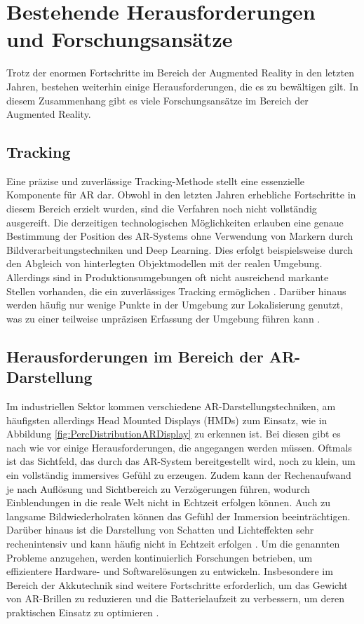 \section{Bestehende Herausforderungen und Forschungsansätze}
Trotz der enormen Fortschritte im Bereich der Augmented Reality in den letzten
Jahren, bestehen weiterhin einige Herausforderungen, die es zu bewältigen gilt.
In diesem Zusammenhang gibt es viele Forschungsansätze im Bereich der Augmented
Reality.
\subsection{Tracking}
Eine präzise und zuverlässige Tracking-Methode stellt eine essenzielle
Komponente für AR dar. Obwohl in den letzten Jahren erhebliche Fortschritte in
diesem Bereich erzielt wurden, sind die Verfahren noch nicht vollständig
ausgereift. Die derzeitigen technologischen Möglichkeiten erlauben eine genaue
Bestimmung der Position des AR-Systems ohne Verwendung von Markern durch
Bildverarbeitungstechniken und Deep Learning. Dies erfolgt beispielsweise durch
den Abgleich von hinterlegten Objektmodellen mit der realen
Umgebung.\cite{7907444} Allerdings sind in Produktionsumgebungen oft nicht
ausreichend markante Stellen vorhanden, die ein zuverlässiges Tracking
ermöglichen \cite{devagiri2022augmented}. Darüber hinaus werden häufig nur
wenige Punkte in der Umgebung zur Lokalisierung genutzt, was zu einer teilweise
unpräzisen Erfassung der Umgebung führen kann \cite{chen2019design}.

\subsection{Herausforderungen im Bereich der AR-Darstellung}

Im industriellen Sektor kommen verschiedene AR-Darstellungstechniken, am
häufigsten allerdings Head Mounted Displays (HMDs) zum Einsatz, wie in Abbildung
\ref{fig:PercDistributionARDisplay} zu erkennen ist. Bei diesen gibt es nach
wie vor einige Herausforderungen, die angegangen werden müssen. Oftmals ist das
Sichtfeld, das durch das AR-System bereitgestellt wird, noch zu klein, um ein
vollständig immersives Gefühl zu erzeugen. Zudem kann der Rechenaufwand je nach
Auflösung und Sichtbereich zu Verzögerungen führen, wodurch Einblendungen in
die reale Welt nicht in Echtzeit erfolgen können. Auch zu langsame
Bildwiederholraten können das Gefühl der Immersion beeinträchtigen. Darüber
hinaus ist die Darstellung von Schatten und Lichteffekten sehr rechenintensiv
und kann häufig nicht in Echtzeit erfolgen \cite{zhao2020pointar}. Um die
genannten Probleme anzugehen, werden kontinuierlich Forschungen betrieben, um
effizientere Hardware- und Softwarelösungen zu entwickeln. Insbesondere im
Bereich der Akkutechnik sind weitere Fortschritte erforderlich, um das Gewicht
von AR-Brillen zu reduzieren und die Batterielaufzeit zu verbessern, um deren
praktischen Einsatz zu optimieren \cite{arena2022overview}.

